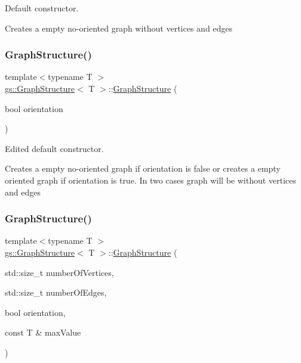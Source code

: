 Default constructor. 

Creates a empty no-\/oriented graph without vertices and edges \mbox{\label{classgs_1_1_graph_structure_aba14df4f7f6e35d54f27d69145603cd5}} 
\subsubsection{\texorpdfstring{Graph\+Structure()}{GraphStructure()}\hspace{0.1cm}{\footnotesize\ttfamily [2/4]}}
{\footnotesize\ttfamily template$<$typename T $>$ \\
\mbox{\hyperlink{classgs_1_1_graph_structure}{gs\+::\+Graph\+Structure}}$<$ T $>$\+::\mbox{\hyperlink{classgs_1_1_graph_structure}{Graph\+Structure}} (\begin{DoxyParamCaption}\item[{bool}]{orientation }\end{DoxyParamCaption})}



Edited default constructor. 

Creates a empty no-\/oriented graph if orientation is false or creates a empty oriented graph if orientation is true. In two cases graph will be without vertices and edges \mbox{\label{classgs_1_1_graph_structure_a7b2ccfb7dfad4317cad69b4296a20173}} 
\subsubsection{\texorpdfstring{Graph\+Structure()}{GraphStructure()}\hspace{0.1cm}{\footnotesize\ttfamily [3/4]}}
{\footnotesize\ttfamily template$<$typename T $>$ \\
\mbox{\hyperlink{classgs_1_1_graph_structure}{gs\+::\+Graph\+Structure}}$<$ T $>$\+::\mbox{\hyperlink{classgs_1_1_graph_structure}{Graph\+Structure}} (\begin{DoxyParamCaption}\item[{std\+::size\+\_\+t}]{number\+Of\+Vertices,  }\item[{std\+::size\+\_\+t}]{number\+Of\+Edges,  }\item[{bool}]{orientation,  }\item[{const T \&}]{max\+Value }\end{DoxyParamCaption})}



